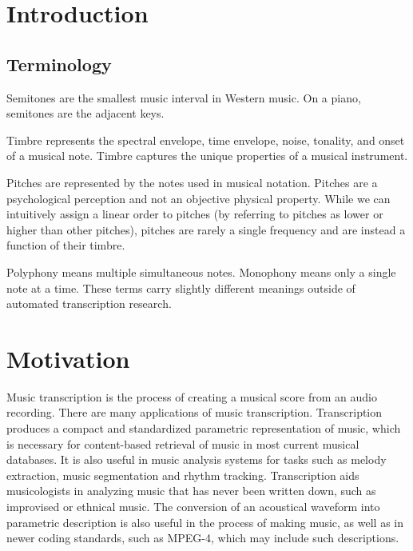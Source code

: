 \documentclass[5p]{elsarticle}
\begin{document}
\setcounter{topnumber}{1}

\section{Introduction}


\subsection{Terminology}
Semitones are the smallest music interval in Western music. On a piano, semitones are the adjacent keys.

Timbre represents the spectral envelope, time envelope, noise, tonality, and onset of a musical note. Timbre captures the unique properties of a musical instrument.

Pitches are represented by the notes used in musical notation. Pitches are a psychological perception and not an objective physical property. While we can intuitively assign a linear order to pitches (by referring to pitches as lower or higher than other pitches), pitches are rarely a single frequency and are instead a function of their timbre.

Polyphony means multiple simultaneous notes. Monophony means only a single note at a time. These terms carry slightly different meanings outside of automated transcription research.

\section{Motivation}



Music transcription is the process of creating a musical score from an audio recording.  There are many applications of music transcription. Transcription produces a compact and standardized parametric representation of music, which is necessary for content-based retrieval of music in most current musical databases. It is also useful in music analysis systems for tasks such as melody extraction, music segmentation and rhythm tracking. Transcription aids musicologists in analyzing music that has never been written down, such as improvised or ethnical music. The conversion of an acoustical waveform into parametric description is also useful in the process of making music, as well as in newer coding standards, such as MPEG-4, which may include such descriptions.
\end{document}
